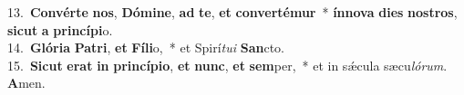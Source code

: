 {13.~}\textbf{Con}\textbf{vér}\textbf{te} \textbf{nos}, \textbf{Dó}\textbf{mi}\textbf{ne}, \textbf{ad} \textbf{te}, \textbf{et} \textbf{con}\textbf{ver}\textbf{té}\textbf{mur}~* \textbf{ín}\textbf{no}\textbf{va} \textbf{di}\textbf{es} \textbf{no}\textbf{stros}, \textbf{si}\textbf{cut} \textbf{a} \textbf{prin}\textbf{cí}\textbf{pi}o.\\
{14.~}\textbf{Gló}\textbf{ri}\textbf{a} \textbf{Pa}\textbf{tri}, \textbf{et} \textbf{Fí}\textbf{li}o,~* et Spirí\textit{tu}\textit{i} \textbf{San}cto.\\
{15.~}\textbf{Si}\textbf{cut} \textbf{e}\textbf{rat} \textbf{in} \textbf{prin}\textbf{cí}\textbf{pi}\textbf{o}, \textbf{et} \textbf{nunc}, \textbf{et} \textbf{sem}per,~* et in sǽcula sæcu\textit{ló}\textit{rum}. \textbf{A}men.\\
